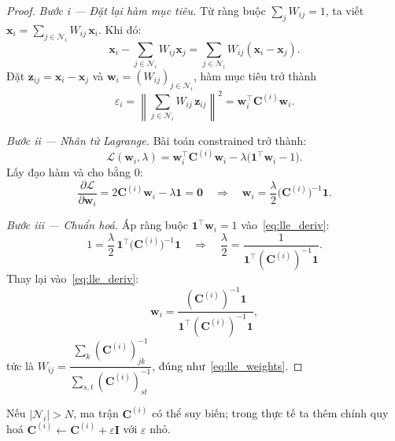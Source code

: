 \begin{proof}
\textit{Bước i — Đặt lại hàm mục tiêu.}
Từ ràng buộc $\sum_j W_{ij}=1$, ta viết
$\mathbf{x}_i = \sum_{j\in\mathcal{N}_i}W_{ij}\,\mathbf{x}_i$.
Khi đó:
\begin{equation*}
  \mathbf{x}_i - \sum_{j\in\mathcal{N}_i}W_{ij}\mathbf{x}_j
  = \sum_{j\in\mathcal{N}_i}W_{ij}(\mathbf{x}_i - \mathbf{x}_j).
\end{equation*}
Đặt $\mathbf{z}_{ij}=\mathbf{x}_i-\mathbf{x}_j$ và $\mathbf{w}_i=(W_{ij})_{j\in
\mathcal{N}_i}$, hàm mục tiêu trở thành
\begin{equation*}
  \varepsilon_i
  = \left\|\sum_{j\in\mathcal{N}_i}W_{ij}\,\mathbf{z}_{ij}\right\|^2
  = \mathbf{w}_i^\top\mathbf{C}^{(i)}\mathbf{w}_i.
\end{equation*}
 
\textit{Bước ii — Nhân tử Lagrange.}
Bài toán constrained trở thành:
\begin{equation*}
  \mathcal{L}(\mathbf{w}_i,\lambda)
  = \mathbf{w}_i^\top\mathbf{C}^{(i)}\mathbf{w}_i
  - \lambda\bigl(\mathbf{1}^\top\mathbf{w}_i - 1\bigr).
\end{equation*}
Lấy đạo hàm và cho bằng $0$:
\begin{equation}\label{eq:lle_deriv}
  \frac{\partial\mathcal{L}}{\partial\mathbf{w}_i}
  = 2\mathbf{C}^{(i)}\mathbf{w}_i - \lambda\mathbf{1} = \mathbf{0}
  \quad\Longrightarrow\quad
  \mathbf{w}_i = \frac{\lambda}{2}\bigl(\mathbf{C}^{(i)}\bigr)^{-1}\mathbf{1}.
\end{equation}
 
\textit{Bước iii — Chuẩn hoá.}
Áp ràng buộc $\mathbf{1}^\top\mathbf{w}_i=1$ vào~\eqref{eq:lle_deriv}:
\begin{equation*}
  1 = \frac{\lambda}{2}\,\mathbf{1}^\top\bigl(\mathbf{C}^{(i)}\bigr)^{-1}\mathbf{1}
  \quad\Longrightarrow\quad
  \frac{\lambda}{2}
  = \frac{1}{\mathbf{1}^\top(\mathbf{C}^{(i)})^{-1}\mathbf{1}}.
\end{equation*}
Thay lại vào~\eqref{eq:lle_deriv}:
\begin{equation*}
  \mathbf{w}_i
  = \frac{(\mathbf{C}^{(i)})^{-1}\mathbf{1}}
         {\mathbf{1}^\top(\mathbf{C}^{(i)})^{-1}\mathbf{1}},
\end{equation*}
tức là
$W_{ij}
 =\dfrac{\sum_{k}(\mathbf{C}^{(i)})^{-1}_{jk}}
        {\sum_{s,t}(\mathbf{C}^{(i)})^{-1}_{st}}$,
đúng như~\eqref{eq:lle_weights}.
\end{proof}
 
\begin{remark}
Nếu $|\mathcal{N}_i| > N$, ma trận $\mathbf{C}^{(i)}$ có thể suy biến; trong
thực tế ta thêm chính quy hoá $\mathbf{C}^{(i)} \leftarrow \mathbf{C}^{(i)}
+ \varepsilon\mathbf{I}$ với $\varepsilon$ nhỏ.
\end{remark}
 

